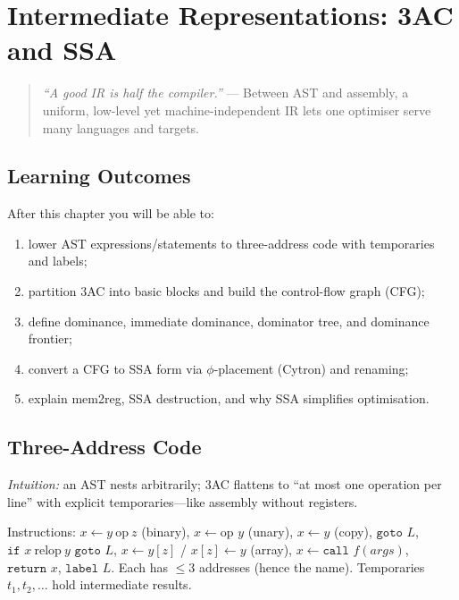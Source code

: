 \chapter{Intermediate Representations: 3AC and SSA}
\label{ch:ir}

\begin{quote}
\emph{``A good IR is half the compiler.''} --- Between AST and assembly, a uniform, low-level yet machine-independent IR lets one optimiser serve many languages and targets.
\end{quote}

\noindent{}
\vspace{0.4em}

\section*{Learning Outcomes}
After this chapter you will be able to:
\begin{enumerate}[label=(L\arabic*)]
    \item lower AST expressions/statements to three-address code with temporaries and labels;
    \item partition 3AC into basic blocks and build the control-flow graph (CFG);
    \item define dominance, immediate dominance, dominator tree, and dominance frontier;
    \item convert a CFG to SSA form via $\phi$-placement (Cytron) and renaming;
    \item explain mem2reg, SSA destruction, and why SSA simplifies optimisation.
\end{enumerate}

\section{Three-Address Code}
\label{sec:3ac}
\emph{Intuition:} an AST nests arbitrarily; 3AC flattens to ``at most one operation per line'' with explicit temporaries---like assembly without registers.

\begin{definition}[3AC]
Instructions: $x \gets y\ \text{op}\ z$ (binary), $x\gets\text{op }y$ (unary), $x\gets y$ (copy), $\texttt{goto }L$, $\texttt{if }x\ \text{relop}\ y\texttt{ goto }L$, $x\gets y[z]$ / $x[z]\gets y$ (array), $x\gets\texttt{call }f(args)$, $\texttt{return }x$, $\texttt{label }L$. Each has $\le3$ addresses (hence the name). Temporaries $t_1,t_2,\dots$ hold intermediate results.
\end{definition}

